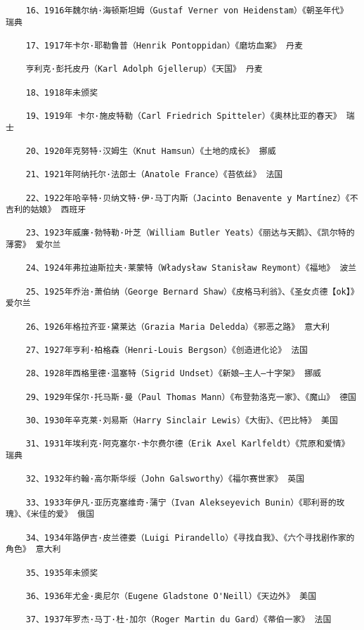 \documentclass[UTF8]{../RepresentationUniverse}
\begin{document}
\begin{lstlisting}
    16、1916年魏尔纳·海顿斯坦姆（Gustaf Verner von Heidenstam）《朝圣年代》 瑞典
    
    17、1917年卡尔·耶勒鲁普（Henrik Pontoppidan）《磨坊血案》 丹麦
    
    亨利克·彭托皮丹（Karl Adolph Gjellerup）《天国》 丹麦
    
    18、1918年未颁奖
    
    19、1919年 卡尔·施皮特勒（Carl Friedrich Spitteler）《奥林比亚的春天》 瑞士
    
    20、1920年克努特·汉姆生（Knut Hamsun）《土地的成长》 挪威
    
    21、1921年阿纳托尔·法郎士（Anatole France）《苔依丝》 法国
    
    22、1922年哈辛特·贝纳文特·伊·马丁内斯（Jacinto Benavente y Martínez）《不吉利的姑娘》 西班牙
    
    23、1923年威廉·勃特勒·叶芝（William Butler Yeats）《丽达与天鹅》、《凯尔特的薄雾》 爱尔兰
    
    24、1924年弗拉迪斯拉夫·莱蒙特（Władysław Stanisław Reymont）《福地》 波兰
    
    25、1925年乔治·萧伯纳（George Bernard Shaw）《皮格马利翁》、《圣女贞德【ok】》 爱尔兰
    
    26、1926年格拉齐亚·黛莱达（Grazia Maria Deledda）《邪恶之路》 意大利
    
    27、1927年亨利·柏格森（Henri-Louis Bergson）《创造进化论》 法国
    
    28、1928年西格里德·温塞特（Sigrid Undset）《新娘—主人—十字架》 挪威
    
    29、1929年保尔·托马斯·曼（Paul Thomas Mann）《布登勃洛克一家》、《魔山》 德国
    
    30、1930年辛克莱·刘易斯（Harry Sinclair Lewis）《大街》、《巴比特》 美国
    
    31、1931年埃利克·阿克塞尔·卡尔费尔德（Erik Axel Karlfeldt）《荒原和爱情》 瑞典
    
    32、1932年约翰·高尔斯华绥（John Galsworthy）《福尔赛世家》 英国
    
    33、1933年伊凡·亚历克塞维奇·蒲宁（Ivan Alekseyevich Bunin）《耶利哥的玫瑰》、《米佳的爱》 俄国
    
    34、1934年路伊吉·皮兰德娄（Luigi Pirandello）《寻找自我》、《六个寻找剧作家的角色》 意大利
    
    35、1935年未颁奖
    
    36、1936年尤金·奥尼尔（Eugene Gladstone O'Neill）《天边外》 美国
    
    37、1937年罗杰·马丁·杜·加尔（Roger Martin du Gard）《蒂伯一家》 法国
    

\end{lstlisting}
\end{document}
